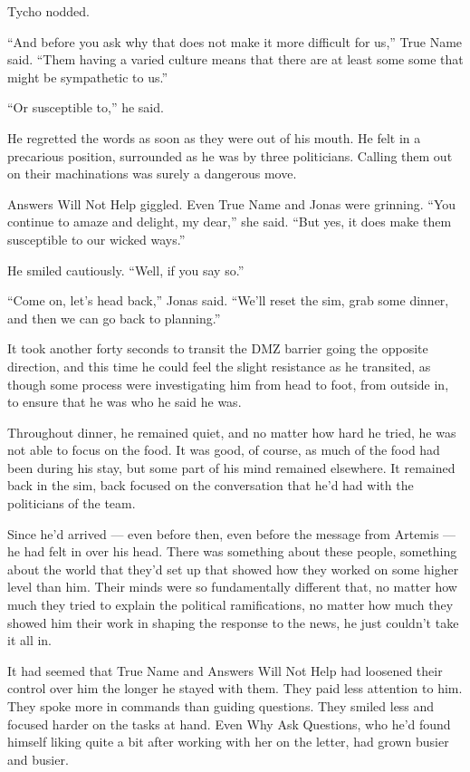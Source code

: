 Tycho nodded.

``And before you ask why that does not make it more difficult for us,'' True Name said. ``Them having a varied culture means that there are at least some some that might be sympathetic to us.''

``Or susceptible to,'' he said.

He regretted the words as soon as they were out of his mouth. He felt in a precarious position, surrounded as he was by three politicians. Calling them out on their machinations was surely a dangerous move.

Answers Will Not Help giggled. Even True Name and Jonas were grinning. ``You continue to amaze and delight, my dear,'' she said. ``But yes, it does make them susceptible to our wicked ways.''

He smiled cautiously. ``Well, if you say so.''

``Come on, let's head back,'' Jonas said. ``We'll reset the sim, grab some dinner, and then we can go back to planning.''

It took another forty seconds to transit the DMZ barrier going the opposite direction, and this time he could feel the slight resistance as he transited, as though some process were investigating him from head to foot, from outside in, to ensure that he was who he said he was.

Throughout dinner, he remained quiet, and no matter how hard he tried, he was not able to focus on the food. It was good, of course, as much of the food had been during his stay, but some part of his mind remained elsewhere. It remained back in the sim, back focused on the conversation that he'd had with the politicians of the team.

Since he'd arrived — even before then, even before the message from Artemis — he had felt in over his head. There was something about these people, something about the world that they'd set up that showed how they worked on some higher level than him. Their minds were so fundamentally different that, no matter how much they tried to explain the political ramifications, no matter how much they showed him their work in shaping the response to the news, he just couldn't take it all in.

It had seemed that True Name and Answers Will Not Help had loosened their control over him the longer he stayed with them. They paid less attention to him. They spoke more in commands than guiding questions. They smiled less and focused harder on the tasks at hand. Even Why Ask Questions, who he'd found himself liking quite a bit after working with her on the letter, had grown busier and busier.

